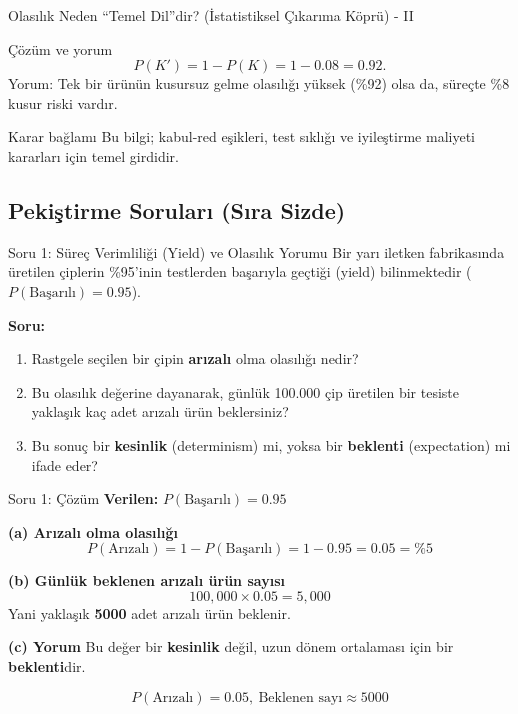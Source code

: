 \documentclass[light]{lutbeamer}
\begin{document}
\begin{frame}{Olasılık Neden ``Temel Dil''dir? (İstatistiksel Çıkarıma Köprü) - II}
    \begin{block}{Çözüm ve yorum}
        \[
            P(K')=1-P(K)=1-0.08=0.92.
        \]
        Yorum: Tek bir ürünün kusursuz gelme olasılığı yüksek (\%92) olsa da,
        süreçte \%8 kusur riski vardır.
    \end{block}

    \begin{alertblock}{Karar bağlamı}
        Bu bilgi; kabul-red eşikleri, test sıklığı ve iyileştirme maliyeti
        kararları için temel girdidir.
    \end{alertblock}
\end{frame}

\subsection{Pekiştirme Soruları (Sıra Sizde)}

\begin{frame}{Soru 1: Süreç Verimliliği (Yield) ve Olasılık Yorumu}
    Bir yarı iletken fabrikasında üretilen çiplerin \%95'inin testlerden başarıyla geçtiği (yield) bilinmektedir ($P(\text{Başarılı})=0.95$).
    
    \textbf{Soru:}
    \begin{enumerate}
        \item[(a)] Rastgele seçilen bir çipin \textbf{arızalı} olma olasılığı nedir?
        \item[(b)] Bu olasılık değerine dayanarak, günlük 100.000 çip üretilen bir tesiste yaklaşık kaç adet arızalı ürün beklersiniz?
        \item[(c)] Bu sonuç bir \textbf{kesinlik} (determinism) mi, yoksa bir \textbf{beklenti} (expectation) mi ifade eder?
    \end{enumerate}
\end{frame}

\begin{frame}{Soru 1: Çözüm}
    \color{red}
    \small
    \textbf{Verilen:} $P(\text{Başarılı})=0.95$
    
    \textbf{(a) Arızalı olma olasılığı}
    \[
    P(\text{Arızalı})=1-P(\text{Başarılı})=1-0.95=0.05=\%5
    \]
    
    \textbf{(b) Günlük beklenen arızalı ürün sayısı}
    \[
    100{,}000 \times 0.05 = 5{,}000
    \]
    Yani yaklaşık \textbf{5000} adet arızalı ürün beklenir.
    
    \textbf{(c) Yorum}
    Bu değer bir \textbf{kesinlik} değil, uzun dönem ortalaması için bir \textbf{beklenti}dir.
    
    \[
    \boxed{P(\text{Arızalı})=0.05,\ \text{Beklenen sayı}\approx 5000}
    \]
\end{frame}
\end{document}

